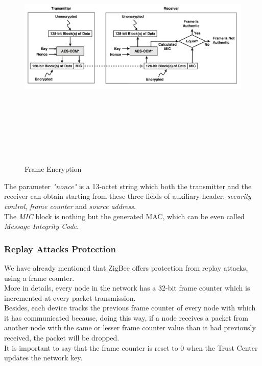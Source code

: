 \documentclass[12pt]{report}
\begin{document}
\begin{figure}[H]
\includegraphics[width=11.5cm,height=12cm,keepaspectratio]{frame_encryption}
\centering
\caption{Frame Encryption}
\end{figure}

The parameter \emph{"nonce"} is a 13-octet string which both the transmitter and the receiver can obtain starting from these three fields of auxiliary header: \emph{security control}, \emph{frame counter} and \emph{source address}.\\
The \emph{MIC} block is nothing but the generated MAC, which can be even called \emph{Message Integrity Code}.

\subsubsection{Replay Attacks Protection}
\bigskip
We have already mentioned that ZigBee offers protection from replay attacks, using a frame counter.\\
More in details, every node in the network has a 32-bit frame counter which is incremented at every packet transmission.\\
Besides, each device tracks the previous frame counter of every node with which it has communicated because, doing this way, if a node receives a packet from another node with the same or lesser frame counter value than it had previously received, the packet will be dropped.\\
It is important to say that the frame counter is reset to 0 when the Trust Center updates the network key.
\end{document}
